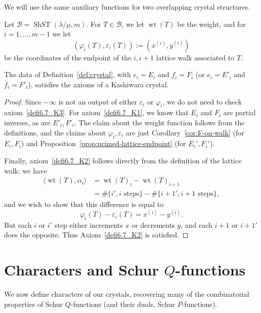 \documentclass[ALCO,ThmDefs,Unicode,epreuves]{cedram}
\DeclareMathOperator{\ShST}{ShST}
\DeclareMathOperator{\wt}{wt}
\newcommand{\B}{\mathcal{B}}
\begin{document}
\noindent We will use the same auxiliary functions for two overlapping crystal structures.

\begin{defi}\label{def:crystal}
Let $\B=\ShST(\lambda/\mu,m)$. For $T\in \B$, we let $\wt (T)$ be the weight, and for $i=1, \ldots, m-1$ we let
\[
(\varphi_i(T),\varepsilon_i(T)) := (x^{(i)},y^{(i)})
\]
be the coordinates of the endpoint of the $i,i+1$ lattice walk associated to $T$.\end{defi}


\begin{prop}
The data of Definition~\ref{def:crystal}, with $e_i=E_i$ and $f_i=F_i$ \textup{(}or $e_i=E'_i$ and $f_i=F'_i$\textup{)}, satisfies the axioms of a Kashiwara crystal.
\end{prop}

\begin{proof}
Since $-\infty$ is not an output of either $\varepsilon_i$ or $\varphi_i$, we do not need to check axiom~\ref{defi6.7_K3}. For axiom~\ref{defi6.7_K1}, we know that $E_i$ and $F_i$ are partial inverses, as are $E'_i, F'_i$. The claim about the weight function follows from the definitions, and the claims about $\varphi_i,\varepsilon_i$ are just Corollary~\ref{cor:F-on-walk} (for $E_i,F_i$) and Proposition~\ref{prop:primed-lattice-endpoint} (for $E_i', F_i'$).

Finally, axiom~\ref{defi6.7_K2} follows directly from the definition of the lattice walk: we have
\begin{align*}
\langle \wt (T),\alpha_i\rangle &= \wt(T)_i-\wt(T)_{i+1} \\
&= \#\{i',i \text{ steps}\} - \#\{i+1',i+1 \text{ steps}\},
\end{align*}
and we wish to show that this difference is equal to 
\[
\varphi_i(T)-\varepsilon_i(T) = x^{(i)}-y^{(i)}.
\] 
But each $i$ or $i'$ step either increments $x$ or decrements $y$, and each $i+1$ or $i+1'$ does the opposite. Thus Axiom~\ref{defi6.7_K2} is satisfied.
\end{proof}

\section{Characters and Schur \texorpdfstring{$Q$}{Q}-functions}\label{sec:characters}

We now define characters of our crystals, recovering many of the combinatorial properties of Schur $Q$-functions (and their duals, Schur $P$-functions).
\end{document}
